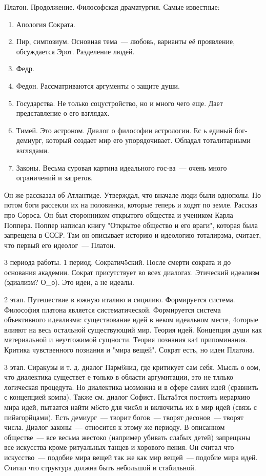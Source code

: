 Платон. Продолжение. 
Философская драматургия. 
Самые известные:

\begin{enumerate} 
	\item Апология Сократа. 
	\item Пир, симпозиум. Основная тема~--- любовь, варианты её проявление, обсуждается Эрот. Разделение людей. 
	\item Федр. 
	\item Федон. Рассматриваются аргументы о защите души. 
	\item Государства. Не только соцустройство, но и много чего еще. Дает представление о его взглядах. 
	\item Тимей. Это астроном. Диалог о философии астрологии. Ес ь единый бог-демиург, который создает мир его упорядочивает. Обладал тоталитарными взглядами. 
	\item Законы. Весьма суровая картина идеального гос-ва~--- очень много ограничений и запретов.
\end{enumerate}

 

Он же рассказал об Атлантиде. 
Утверждал, что вначале люди были однополы. Но потом боги рассекли их на половинки, которые теперь и ходят по земле. 
Рассказ про Сороса. Он был сторонником открытого общества и учеником Карла Поппера. 
Поппер написал книгу "Открытое общество и его враги", которая была запрещена в СССР. 
Там он описывает историю и идеологию тоталирзма, считает, что первый его идеолог~--- Платон. 

3 периода работы. 
1 период. Сократич5ский. После смерти сократа и до основания академии. Сократ присутствует во всех диалогах. Этический идеализм (эдиализм? О_о). Это идеи, а не идеалы. 

2 этап. Путешествие в южную италию и сицилию. Формируется система. Философия платона является систематической. 
Формируется система объективного идеализма: существование идей в неком идеальном месте, 4оторые влияют на весь остальной существующий мир. Теория идей. Концепция души как материальной и неучтожимой сущности. 
Теория познания ка4 припоминания. Критика чувственного познания и "мира вещей". Сократ есть, но идеи Платона. 

3 этап. Сиракузы и т. д. диалог Парм6нид, где критикует сам себя. Мысль о оом, что диалектика существет е только в области аргумнтации, это не тллько логическая процедута. 
Но диалектика ыозможна и в сфере самих идей (сравнить с концепцией компа). Также см. диалог Софист. Пыта5тся постоить иерархию мира идей, пытаатся найти м6сто для чис5л и включитьь их в мир идей (связь с пийагорйцами). 
Есть демиург~--- творит богов~--- творят десонов~--- творят числа. Диалог законы~--- относится к этому же периоду. 
В описанном обществе~--- все весьма жестоко (например убивать слабых детей) запрещкны все искусства кроме ритуальных танцев и хорового пения. 
Он считал что искусство~--- подобие мира вещей так же как мир вещей~--- подобие мира идей. Считал что структура должна быть небольшой и стабильной. 

